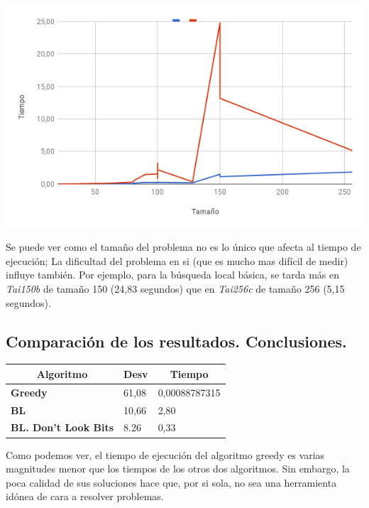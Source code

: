 \documentclass[a4paper, 12pt]{article}
\begin{document}
      \begin{center}
         \includegraphics[scale=0.6]{bl-vs-dlb}
      \end{center}
      
      Se puede ver como el tamaño del problema no es lo único que afecta al tiempo de ejecución; La dificultad del problema en si (que es mucho mas difícil de medir) influye también. Por ejemplo, para la búsqueda local básica, se tarda más en \textit{Tai150b} de tamaño 150 (24,83 segundos) que en \textit{Tai256c} de tamaño 256 (5,15 segundos).
      
      
      \newpage
      \subsection{Comparación de los resultados. Conclusiones.}
\begin{table}[H]
\centering
\label{my-label}
\begin{tabular}{|l|l|l|}
\hline
\multicolumn{1}{|c|}{\textbf{Algoritmo}} & \textbf{Desv} & \multicolumn{1}{c|}{\textbf{Tiempo}} \\ \hline
\textbf{Greedy}                          & 61,08         & 0,00088787315                        \\ \hline
\textbf{BL}                              & 10,66         & 2,80                                 \\ \hline
\textbf{BL. Don't Look Bits}             & 8.26          & 0,33                                 \\ \hline
\end{tabular}
\end{table}
      
      Como podemos ver, el tiempo de ejecución del algoritmo greedy es varias magnitudes menor que los tiempos de los otros dos algoritmos. Sin embargo, la poca calidad de sus soluciones hace que, por si sola, no sea una herramienta idónea de cara a resolver problemas.\\
      
\end{document}
